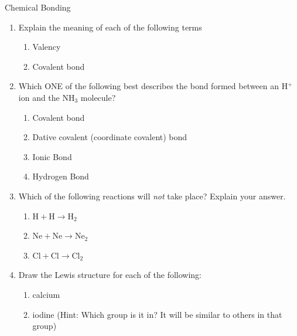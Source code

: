             \begin{eocexercises}{Chemical Bonding}
            \nopagebreak
      \label{m38689*id147820}\begin{enumerate}[noitemsep, label=\textbf{\arabic*}. ] 
            \label{m38689*uid158}\item Explain the meaning of each of the following terms
\label{m38689*id147842}\begin{enumerate}[noitemsep, label=\textbf{\alph*}. ] 
            \label{m38689*uid159}\item Valency
\label{m38689*uid160}\item Covalent bond
\end{enumerate}
                \label{m38689*uid162}\item Which ONE of the following best describes the bond formed between an $\mathrm{H}{}^{+}$ ion and the $\mathrm{NH}{}_{3}$ molecule?
\label{m38689*id147923}\begin{enumerate}[noitemsep, label=\textbf{\alph*}. ] 
            \label{m38689*uid163}\item Covalent bond
\label{m38689*uid164}\item Dative covalent (coordinate covalent) bond
\label{m38689*uid165}\item Ionic Bond
\label{m38689*uid166}\item Hydrogen Bond
\end{enumerate}
                \label{m38689*uid171}\item Which of the following reactions will \textsl{not} take place? Explain your answer.
\label{m38689*id148047}\begin{enumerate}[noitemsep, label=\textbf{\alph*}. ] 
            \label{m38689*uid172}\item $\mathrm{H}+\mathrm{H}\to {\mathrm{H}}_{2}$\label{m38689*uid173}\item $\mathrm{Ne}+\mathrm{Ne}\to {\mathrm{Ne}}_{2}$\label{m38689*uid174}\item $\mathrm{Cl}+\mathrm{Cl}\to {\mathrm{Cl}}_{2}$\end{enumerate}
                \label{m38689*uid175}\item Draw the Lewis structure for each of the following:
\label{m38689*id148172}\begin{enumerate}[noitemsep, label=\textbf{\alph*}. ] 
            \label{m38689*uid176}\item calcium
\label{m38689*uid177}\item iodine (Hint: Which group is it in? It will be similar to others in that group)

\end{enumerate}
\end{enumerate}
\end{eocexercises}
